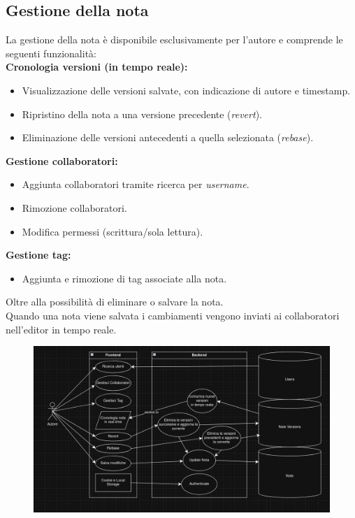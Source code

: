 \documentclass[11pt]{article}
\begin{document}
\subsection{Gestione della nota}
La gestione della nota è disponibile esclusivamente per l’autore e comprende le seguenti funzionalità: \\
\textbf{Cronologia versioni (in tempo reale):}
\begin{itemize}
    \item Visualizzazione delle versioni salvate, con indicazione di autore e timestamp.
    \item Ripristino della nota a una versione precedente (\textit{revert}).
    \item Eliminazione delle versioni antecedenti a quella selezionata (\textit{rebase}).
\end{itemize}
\textbf{Gestione collaboratori:}
\begin{itemize}
    \item Aggiunta collaboratori tramite ricerca per \textit{username}.
    \item Rimozione collaboratori.
    \item Modifica permessi (scrittura/sola lettura).
\end{itemize}
\textbf{Gestione tag:}
\begin{itemize}
    \item Aggiunta e rimozione di tag associate alla nota.
\end{itemize}
Oltre alla possibilità di eliminare o salvare la nota.\\ 
Quando una nota viene salvata i cambiamenti vengono inviati ai collaboratori nell'editor in tempo reale.
\begin{figure}[H]
    \centering
    \includegraphics[width=1\textwidth]{./Resources/Diagrams/UML-ImpostazioniNota.png}
\end{figure}
\end{document}
